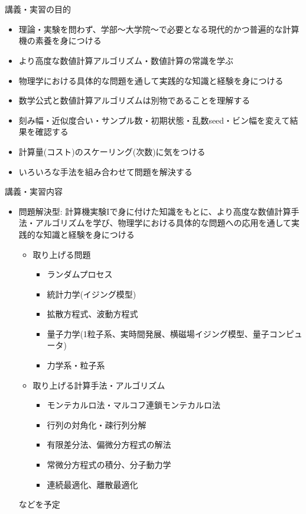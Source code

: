 \section{}

\begin{frame}[t]{講義・実習の目的}
  \begin{itemize}
  \item 理論・実験を問わず、学部〜大学院〜で必要となる現代的かつ普遍的な計算機の素養を身につける
  \item より高度な数値計算アルゴリズム・数値計算の常識を学ぶ
  \item 物理学における具体的な問題を通して実践的な知識と経験を身につける\\[2em]
  \item 数学公式と数値計算アルゴリズムは別物であることを理解する
  \item 刻み幅・近似度合い・サンプル数・初期状態・乱数seed・ビン幅を変えて結果を確認する
  \item 計算量(コスト)のスケーリング(次数)に気をつける
  \item いろいろな手法を組み合わせて問題を解決する
  \end{itemize}
\end{frame}

\begin{frame}[t]{講義・実習内容}
  \begin{itemize}
    \setlength{\itemsep}{1em}
  \item 問題解決型: 計算機実験Iで身に付けた知識をもとに、より高度な数値計算手法・アルゴリズムを学び、物理学における具体的な問題への応用を通して実践的な知識と経験を身につける
    \begin{itemize}
    \item 取り上げる問題
      \begin{itemize}
      \item ランダムプロセス
      \item 統計力学(イジング模型)
      \item 拡散方程式、波動方程式
      \item 量子力学(1粒子系、実時間発展、横磁場イジング模型、量子コンピュータ)
      \item 力学系・粒子系
        
      \end{itemize}
    \item 取り上げる計算手法・アルゴリズム
      \begin{itemize}
      \item モンテカルロ法・マルコフ連鎖モンテカルロ法
      \item 行列の対角化・疎行列分解
      \item 有限差分法、偏微分方程式の解法
      \item 常微分方程式の積分、分子動力学
      \item 連続最適化、離散最適化
      \end{itemize}
    \end{itemize}
    などを予定
  \end{itemize}
\end{frame}


